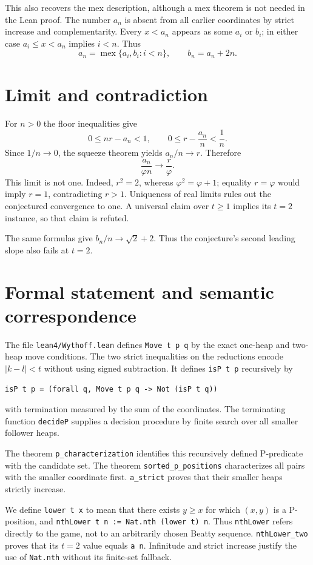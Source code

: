 \documentclass[11pt]{article}
\begin{document}
This also recovers the mex description, although a mex theorem is not needed in the Lean proof. The number $a_n$ is absent from all earlier coordinates by strict increase and complementarity. Every $x<a_n$ appears as some $a_i$ or $b_i$; in either case $a_i\le x<a_n$ implies $i<n$. Thus
\[
a_n=\operatorname{mex}\{a_i,b_i:i<n\},\qquad b_n=a_n+2n.
\]

\section{Limit and contradiction}
For $n>0$ the floor inequalities give
\[
0\le nr-a_n<1,\qquad
0\le r-\frac{a_n}{n}<\frac1n.
\]
Since $1/n\to0$, the squeeze theorem yields $a_n/n\to r$. Therefore
\[
\frac{a_n}{\varphi n}\to\frac r\varphi.
\]
This limit is not one. Indeed, $r^2=2$, whereas $\varphi^2=\varphi+1$; equality $r=\varphi$ would imply $r=1$, contradicting $r>1$. Uniqueness of real limits rules out the conjectured convergence to one. A universal claim over $t\ge1$ implies its $t=2$ instance, so that claim is refuted.

The same formulas give $b_n/n\to\sqrt2+2$. Thus the conjecture's second leading slope also fails at $t=2$.

\section{Formal statement and semantic correspondence}
The file \texttt{lean4/Wythoff.lean} defines \texttt{Move t p q} by the exact one-heap and two-heap move conditions. The two strict inequalities on the reductions encode $|k-l|<t$ without using signed subtraction. It defines \texttt{isP t p} recursively by
\begin{lstlisting}
isP t p = (forall q, Move t p q -> Not (isP t q))
\end{lstlisting}
with termination measured by the sum of the coordinates. The terminating function \texttt{decideP} supplies a decision procedure by finite search over all smaller follower heaps.

The theorem \texttt{p\_characterization} identifies this recursively defined P-predicate with the candidate set. The theorem \texttt{sorted\_p\_positions} characterizes all pairs with the smaller coordinate first. \texttt{a\_strict} proves that their smaller heaps strictly increase.

We define \texttt{lower t x} to mean that there exists $y\ge x$ for which $(x,y)$ is a P-position, and \texttt{nthLower t n := Nat.nth (lower t) n}. Thus \texttt{nthLower} refers directly to the game, not to an arbitrarily chosen Beatty sequence. \texttt{nthLower\_two} proves that its $t=2$ value equals \texttt{a n}. Infinitude and strict increase justify the use of \texttt{Nat.nth} without its finite-set fallback.
\end{document}
